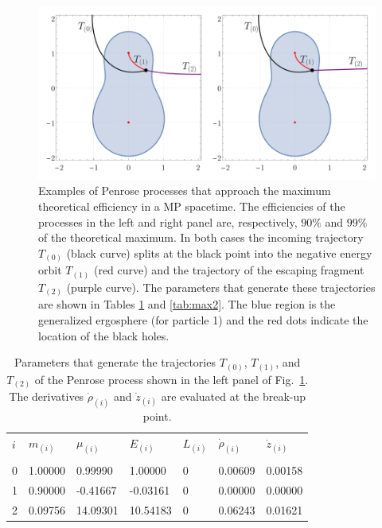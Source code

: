 \begin{figure}[!htbp]
    \centering
    \includegraphics[scale=0.70]{img/penrose_binaries/fig11.pdf}
    \caption{Examples of Penrose processes that approach the maximum theoretical efficiency in a MP spacetime. The efficiencies of the processes in the left and right panel are, respectively, $90 \%$ and $99 \%$ of the theoretical maximum. In both cases the incoming trajectory $T_{(0)}$ (black curve) splits at the black point into the negative energy orbit $T_{(1)}$ (red curve) and the trajectory of the escaping fragment $T_{(2)}$ (purple curve). The parameters that generate these trajectories are shown in Tables \ref{tab:max1} and \ref{tab:max2}. The blue region is the generalized ergosphere (for particle 1) and the red dots indicate the location of the black holes.}
    \label{fig:examplemax1}
\end{figure}

\renewcommand{\arraystretch}{1.2}
\begin{table}[!htbp]

    \begin{tabular}{lllllll}
        $i$ & $m_{(i)}$ & $\mu_{(i)}$ & $E_{(i)}$ & $L_{(i)}$ & $\dot{\rho}_{(i)}$ & $\dot{z}_{(i)}$ \\ \vspace{-0.3cm} \\
        0   & 1.00000   & 0.99990     & 1.00000   & 0         & 0.00609            & 0.00158         \\
        1   & 0.90000   & -0.41667    & -0.03161  & 0         & 0.00000            & 0.00000         \\
        2   & 0.09756   & 14.09301    & 10.54183  & 0         & 0.06243            & 0.01621         \\
    \end{tabular}

    \caption{Parameters that generate the trajectories $T_{(0)}$, $T_{(1)}$, and $T_{(2)}$ of the Penrose process shown in the left panel of Fig.~\ref{fig:examplemax1}. The derivatives $\dot{\rho}_{(i)}$ and $\dot{z}_{(i)}$ are evaluated at the break-up point.
    }
    \label{tab:max1}
\end{table}


